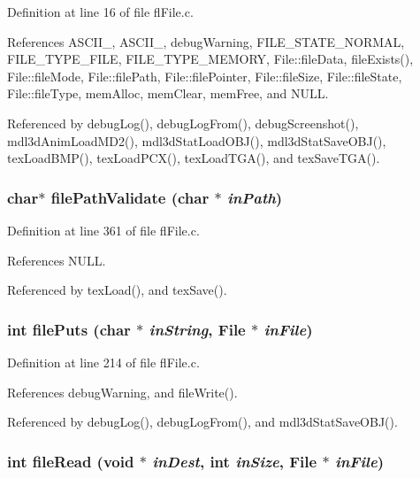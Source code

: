 Definition at line 16 of file fl\-File.c.

References ASCII\_, ASCII\_, debug\-Warning, FILE\_\-STATE\_\-NORMAL, FILE\_\-TYPE\_\-FILE, FILE\_\-TYPE\_\-MEMORY, File::file\-Data, file\-Exists(), File::file\-Mode, File::file\-Path, File::file\-Pointer, File::file\-Size, File::file\-State, File::file\-Type, mem\-Alloc, mem\-Clear, mem\-Free, and NULL.

Referenced by debug\-Log(), debug\-Log\-From(), debug\-Screenshot(), mdl3d\-Anim\-Load\-MD2(), mdl3d\-Stat\-Load\-OBJ(), mdl3d\-Stat\-Save\-OBJ(), tex\-Load\-BMP(), tex\-Load\-PCX(), tex\-Load\-TGA(), and tex\-Save\-TGA().
\subsubsection{\setlength{\rightskip}{0pt plus 5cm}char$\ast$ file\-Path\-Validate (char $\ast$ {\em in\-Path})}\label{flFile_8h_0dad80defd73606d8e58ae85ec6bf68b}




Definition at line 361 of file fl\-File.c.

References NULL.

Referenced by tex\-Load(), and tex\-Save().
\subsubsection{\setlength{\rightskip}{0pt plus 5cm}int file\-Puts (char $\ast$ {\em in\-String}, {\bf File} $\ast$ {\em in\-File})}\label{flFile_8h_d30509e008ced313861416066057940d}




Definition at line 214 of file fl\-File.c.

References debug\-Warning, and file\-Write().

Referenced by debug\-Log(), debug\-Log\-From(), and mdl3d\-Stat\-Save\-OBJ().
\subsubsection{\setlength{\rightskip}{0pt plus 5cm}int file\-Read (void $\ast$ {\em in\-Dest}, int {\em in\-Size}, {\bf File} $\ast$ {\em in\-File})}\label{flFile_8h_bd15952bb98932926572c806c3b3cf20}




